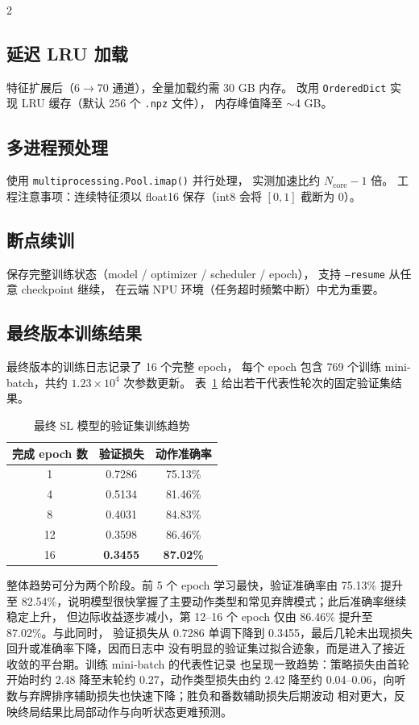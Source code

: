 \documentclass{article}
\begin{document}
\begin{multicols}{2}
\subsection{延迟 LRU 加载}

特征扩展后（6$\to$70 通道），全量加载约需 30 GB 内存。
改用 \texttt{OrderedDict} 实现 LRU 缓存（默认 256 个 \texttt{.npz} 文件），
内存峰值降至 $\sim$4 GB。

\subsection{多进程预处理}

使用 \texttt{multiprocessing.Pool.imap()} 并行处理，
实测加速比约 $N_{\text{core}}-1$ 倍。
工程注意事项：连续特征须以 float16 保存（int8 会将 $[0,1]$ 截断为 0）。

\subsection{断点续训}

保存完整训练状态（model / optimizer / scheduler / epoch），
支持 \texttt{--resume} 从任意 checkpoint 继续，
在云端 NPU 环境（任务超时频繁中断）中尤为重要。

\subsection{最终版本训练结果}

最终版本的训练日志记录了 16 个完整 epoch，
每个 epoch 包含 769 个训练 mini-batch，共约 $1.23\times10^4$ 次参数更新。
表~\ref{tab:final-training} 给出若干代表性轮次的固定验证集结果。

\begin{table}[H]
\centering
\caption{最终 SL 模型的验证集训练趋势}
\label{tab:final-training}
\small
\setlength{\tabcolsep}{5pt}
\begin{tabular}{ccc}
\toprule
完成 epoch 数 & 验证损失 & 动作准确率 \\
\midrule
1  & 0.7286 & 75.13\% \\
4  & 0.5134 & 81.46\% \\
8  & 0.4031 & 84.83\% \\
12 & 0.3598 & 86.46\% \\
16 & \textbf{0.3455} & \textbf{87.02\%} \\
\bottomrule
\end{tabular}
\end{table}

整体趋势可分为两个阶段。前 5 个 epoch 学习最快，验证准确率由 75.13\% 提升至
82.54\%，说明模型很快掌握了主要动作类型和常见弃牌模式；此后准确率继续稳定上升，
但边际收益逐步减小，第 12--16 个 epoch 仅由 86.46\% 提升至 87.02\%。与此同时，
验证损失从 0.7286 单调下降到 0.3455，最后几轮未出现损失回升或准确率下降，因而日志中
没有明显的验证集过拟合迹象，而是进入了接近收敛的平台期。训练 mini-batch 的代表性记录
也呈现一致趋势：策略损失由首轮开始时约 2.48 降至末轮约 0.27，动作类型损失由约 2.42
降至约 0.04--0.06，向听数与弃牌排序辅助损失也快速下降；胜负和番数辅助损失后期波动
相对更大，反映终局结果比局部动作与向听状态更难预测。


\end{multicols}
\end{document}
